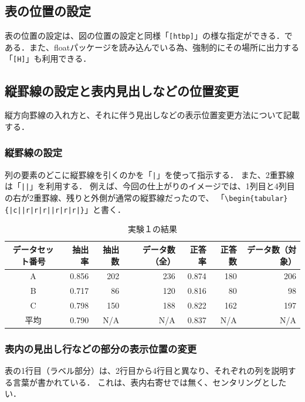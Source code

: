 \subsection{表の位置の設定}
表の位置の設定は、図の位置の設定と同様「\verb+[htbp]+」の様な指定ができる．である．また、floatパッケージを読み込んでいる為、強制的にその場所に出力する「\verb+[H]+」も利用できる．

\subsection{縦罫線の設定と表内見出しなどの位置変更}
縦方向罫線の入れ方と、それに伴う見出しなどの表示位置変更方法について記載する．

\subsubsection{縦罫線の設定}
列の要素のどこに縦罫線を引くのかを「\verb+|+」を使って指示する．
また、2重罫線は「\verb+||+」を利用する．
例えば、今回の仕上がりのイメージでは、1列目と4列目の右が2重罫線、残りと外側が通常の縦罫線だったので、
「\verb+\begin{tabular}{|c||r|r|r||r|r|r|}+」と書く．
\begin{table}[H]
\caption{実験１の結果}
\centering
\begin{tabular}{|c||r|r|r||r|r|r|}
\hline
データセット番号 & 抽出率 & 抽出数 & データ数（全） & 正答率 & 正答数 & データ数（対象）\\ \hline \hline
A & 0.856 & 202 & 236 & 0.874 & 180 & 206\\ \hline
B & 0.717 & 86 & 120 & 0.816 & 80 & 98\\ \hline
C & 0.798 & 150 & 188 & 0.822 & 162 & 197\\ \hline \hline
平均 & 0.790 & N/A & N/A & 0.837 & N/A & N/A\\ \hline
\end{tabular}
\label{table:resultEx1d}
\end{table}

\subsubsection{表内の見出し行などの部分の表示位置の変更}
表の1行目（ラベル部分）は、2行目から4行目と異なり、それぞれの列を説明する言葉が書かれている．
これは、表内右寄せでは無く、センタリングとしたい．

